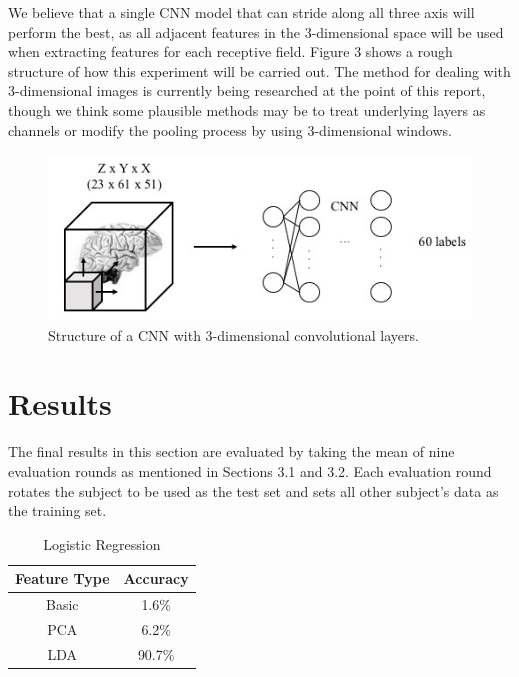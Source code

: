 \documentclass{article} %
\begin{document}
We believe that a single CNN model that can stride along all three axis will perform the best, as all adjacent features in the 3-dimensional space will be used when extracting features for each receptive field. Figure 3 shows a rough structure of how this experiment will be carried out. The method for dealing with 3-dimensional images is currently being researched at the point of this report, though we think some plausible methods may be to treat underlying layers as channels or modify the pooling process by using 3-dimensional windows.

\begin{figure}[h]
	\centering
	\includegraphics[height=0.2\textheight]{./img/cnn_proto_c.png}
	\caption{Structure of a CNN with 3-dimensional convolutional layers.}
\end{figure}

\section{Results}

The final results in this section are evaluated by taking the mean of nine evaluation rounds as mentioned in Sections 3.1 and 3.2. Each evaluation round rotates the subject to be used as the test set and sets all other subject's data as the training set.

\begin{table}[H]
\centering
\caption{Logistic Regression}

\begin{tabular}{|c|c|}
\hline
\textbf{Feature Type} & \textbf{Accuracy} \\ \hline
Basic                 &          1.6\%         \\ \hline
PCA                   &           6.2\%        \\ \hline
LDA                   &            90.7\%       \\ \hline
\end{tabular}
\end{table}
\end{document}
